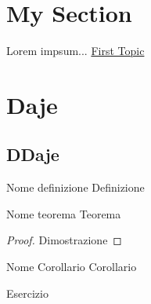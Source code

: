 \documentclass[11pt, a4paper, twoside]{article}
\begin{document}
\section{My Section}
\label{sec:my-section}

Lorem impsum... \hyperref[sec:my-section]{First Topic}


\section{Daje}

\subsection{DDaje}

\begin{defn}{Nome definizione}{}
	Definizione
\end{defn}

\begin{thm}{Nome teorema}{}
	Teorema
\end{thm}

\begin{proof}
	Dimostrazione
\end{proof}

\begin{cor}{Nome Corollario}{}
	Corollario
\end{cor}

\begin{ese}
	Esercizio
\end{ese}

\begin{sol}
\end{sol}

\end{document}
